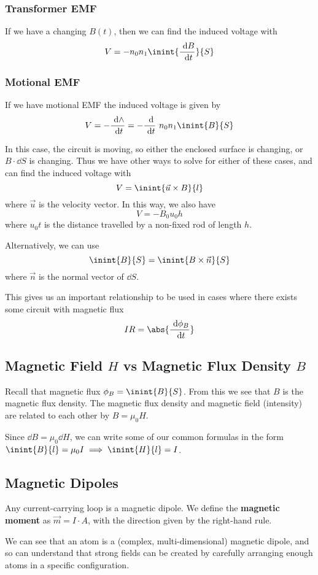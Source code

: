 \documentclass[12pt]{article}
\begin{document}
\subsubsection*{Transformer EMF}
If we have a changing $B(t)$, then we can find the induced voltage with \[ V = -n_0n_1 \inint{\frac{\dd B}{\dd t}}{S} \]

\subsubsection*{Motional EMF}
If we have motional EMF the induced voltage is given by \[ V = - \frac{\dd \land}{\dd t} = - \frac{\dd}{\dd t}\ n_0n_1 \inint{B}{S} \]

In this case, the circuit is moving, so either the enclosed surface is changing, or $B \cdot \dd S$ is changing. Thus we have other ways to solve for either of these cases, and can find the induced voltage with \[ V = \inint{\vec{u} \times B}{l} \] where $\vec{u}$ is the velocity vector. In this way, we also have \[ V = - B_0 u_0 h \] where $u_0 t$ is the distance travelled by a non-fixed rod of length $h$.

Alternatively, we can use \[ \inint{B}{S} = \inint{B \times \vec{n}}{S} \] where $\vec{n}$ is the normal vector of $\dd S$.

This gives us an important relationship to be used in cases where there exists some circuit with magnetic flux \[ IR = \abs{\frac{\dd \phi_B}{\dd t}} \]

\subsection*{Magnetic Field $H$ vs Magnetic Flux Density $B$}
Recall that magnetic flux $\phi_B = \inint{B}{S}$. From this we see that $B$ is the magnetic flux density. The magnetic flux density and magnetic field (intensity) are related to each other by $B = \mu_0 H$.

Since $\dd B = \mu_0 \dd H$, we can write some of our common formulas in the form $\inint{B}{l} = \mu_0 I \implies \inint{H}{l} = I$.

\subsection*{Magnetic Dipoles}
Any current-carrying loop is a magnetic dipole. We define the {\bf magnetic moment} as $\vec{m} = I \cdot A$, with the direction given by the right-hand rule.

We can see that an atom is a (complex, multi-dimensional) magnetic dipole, and so can understand that strong fields can be created by carefully arranging enough atoms in a specific configuration.
\end{document}
